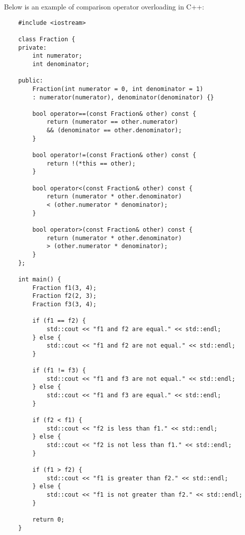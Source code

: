 \begin{solution}
    Below is an example of comparison operator overloading in C++: \\
    \horizontalline
    \begin{verbatim}
    #include <iostream>

    class Fraction {
    private:
        int numerator;
        int denominator;
    
    public:
        Fraction(int numerator = 0, int denominator = 1) 
        : numerator(numerator), denominator(denominator) {}
    
        bool operator==(const Fraction& other) const {
            return (numerator == other.numerator) 
            && (denominator == other.denominator);
        }
    
        bool operator!=(const Fraction& other) const {
            return !(*this == other);
        }
    
        bool operator<(const Fraction& other) const {
            return (numerator * other.denominator) 
            < (other.numerator * denominator);
        }
    
        bool operator>(const Fraction& other) const {
            return (numerator * other.denominator) 
            > (other.numerator * denominator);
        }
    };
    
    int main() {
        Fraction f1(3, 4);
        Fraction f2(2, 3);
        Fraction f3(3, 4);
    
        if (f1 == f2) {
            std::cout << "f1 and f2 are equal." << std::endl;
        } else {
            std::cout << "f1 and f2 are not equal." << std::endl;
        }
    
        if (f1 != f3) {
            std::cout << "f1 and f3 are not equal." << std::endl;
        } else {
            std::cout << "f1 and f3 are equal." << std::endl;
        }
    
        if (f2 < f1) {
            std::cout << "f2 is less than f1." << std::endl;
        } else {
            std::cout << "f2 is not less than f1." << std::endl;
        }
    
        if (f1 > f2) {
            std::cout << "f1 is greater than f2." << std::endl;
        } else {
            std::cout << "f1 is not greater than f2." << std::endl;
        }
    
        return 0;
    }
    \end{verbatim} \\
    \horizontalline


\end{solution}
